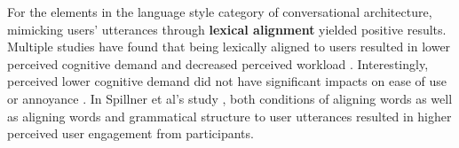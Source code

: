 \documentclass[sigconf,screen,review, anonymous]{acmart}
\newcommand{\cmt}[1]{}%
\begin{document}


For the elements in the language style category of conversational architecture, mimicking users' utterances through \textbf{lexical alignment} yielded positive results. Multiple studies have found that being lexically aligned to users resulted in lower perceived cognitive demand and decreased perceived workload \cite{huiyang2022improving}\cmt{[17]}\cite{linnemann2018can}\cmt{[15]}\cite{spillner2021talk}\cmt{[18]}. Interestingly, perceived lower cognitive demand did not have significant impacts on ease of use \cite{linnemann2018can}\cmt{[15]} or annoyance \cite{huiyang2022improving}\cmt{[17]}. In Spillner et al's study \cite{spillner2021talk}\cmt{[18]}, both conditions of aligning words as well as aligning words and grammatical structure to user utterances resulted in higher perceived user engagement from participants. 

%



\end{document}

